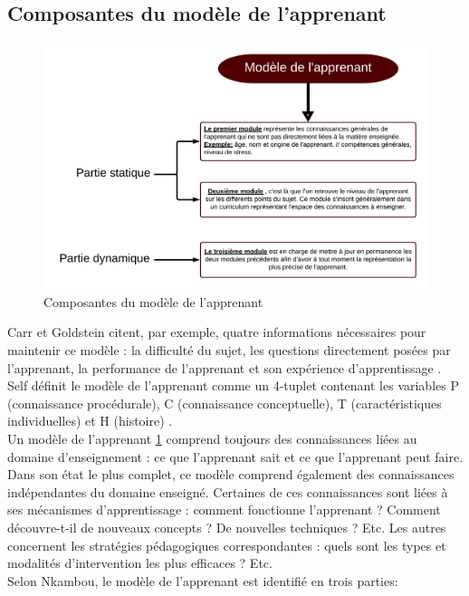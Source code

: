 \subsection{Composantes du modèle de l'apprenant}
\begin{figure}[H]
	\begin{center}
		\includegraphics[width=\textwidth]{images/chapitre2/Learner_model.png}
	\end{center}
\caption{Composantes du modèle de l'apprenant}
\label{learnerModel}
\end{figure}
Carr et Goldstein citent, par exemple, quatre informations nécessaires pour maintenir ce modèle : la difficulté du sujet, les questions directement posées par l’apprenant, la performance de l’apprenant et son expérience d’apprentissage \cite{knowledge_based_scheduling_program}. Self définit le modèle de l'apprenant comme un 4-tuplet contenant les variables P (connaissance procédurale), C (connaissance conceptuelle), T (caractéristiques individuelles) et H (histoire) \cite{Elster1987self}. \\
Un modèle de l'apprenant \ref{learnerModel} comprend toujours des connaissances liées au domaine d'enseignement : ce que l'apprenant sait et ce que l'apprenant peut faire. Dans son état le plus complet, ce modèle comprend également des connaissances indépendantes du domaine enseigné. Certaines de ces connaissances sont liées à ses mécanismes d'apprentissage : comment fonctionne l'apprenant ? Comment découvre-t-il de nouveaux concepts ? De nouvelles techniques ? Etc. Les autres concernent les stratégies pédagogiques correspondantes : quels sont les types et modalités d'intervention les plus efficaces ? Etc. \\
Selon Nkambou, le modèle de l'apprenant est identifié en trois parties: \cite{modeles_outils_applications}

